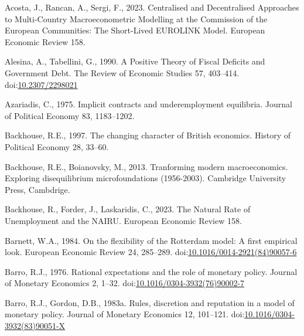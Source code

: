 \documentclass[
  12pt,
  onecolumn]{article}
\newlength{\cslhangindent}
\newlength{\cslentryspacingunit} %
\newenvironment{CSLReferences}[2] %
 {%
  \setlength{\parindent}{0pt}
  \ifodd #1
  \let\oldpar\par
  \def\par{\hangindent=\cslhangindent\oldpar}
  \fi
  \setlength{\parskip}{#2\cslentryspacingunit}
 }%
 {}
\begin{document}
\hypertarget{refs}{}
\begin{CSLReferences}{1}{0}
\leavevmode{}%
Acosta, J., Rancan, A., Sergi, F., 2023. Centralised and {Decentralised Approaches} to {Multi-Country Macroeconometric Modelling} at the {Commission} of the {European Communities}: {The Short-Lived EUROLINK Model}. European Economic Review 158.

\leavevmode{}%
Alesina, A., Tabellini, G., 1990. A {Positive Theory} of {Fiscal Deficits} and {Government Debt}. The Review of Economic Studies 57, 403--414. doi:\href{https://doi.org/10.2307/2298021}{10.2307/2298021}

\leavevmode{}%
Azariadis, C., 1975. Implicit contracts and underemployment equilibria. Journal of Political Economy 83, 1183--1202.

\leavevmode{}%
Backhouse, R.E., 1997. The changing character of {British} economics. History of Political Economy 28, 33--60.

\leavevmode{}%
Backhouse, R.E., Boianovsky, M., 2013. Tranforming modern macroeconomics. {Exploring} disequilibrium microfoundations (1956-2003). {Cambridge University Press}, {Cambdrige}.

\leavevmode{}%
Backhouse, R., Forder, J., Laskaridis, C., 2023. The {Natural Rate} of {Unemployment} and the {NAIRU}. European Economic Review 158.

\leavevmode{}%
Barnett, W.A., 1984. On the flexibility of the {Rotterdam} model: {A} first empirical look. European Economic Review 24, 285--289. doi:\href{https://doi.org/10.1016/0014-2921(84)90057-6}{10.1016/0014-2921(84)90057-6}

\leavevmode{}%
Barro, R.J., 1976. Rational expectations and the role of monetary policy. Journal of Monetary Economics 2, 1--32. doi:\href{https://doi.org/10.1016/0304-3932(76)90002-7}{10.1016/0304-3932(76)90002-7}

\leavevmode{}%
Barro, R.J., Gordon, D.B., 1983a. Rules, discretion and reputation in a model of monetary policy. Journal of Monetary Economics 12, 101--121. doi:\href{https://doi.org/10.1016/0304-3932(83)90051-X}{10.1016/0304-3932(83)90051-X}


\end{CSLReferences}
\end{document}
